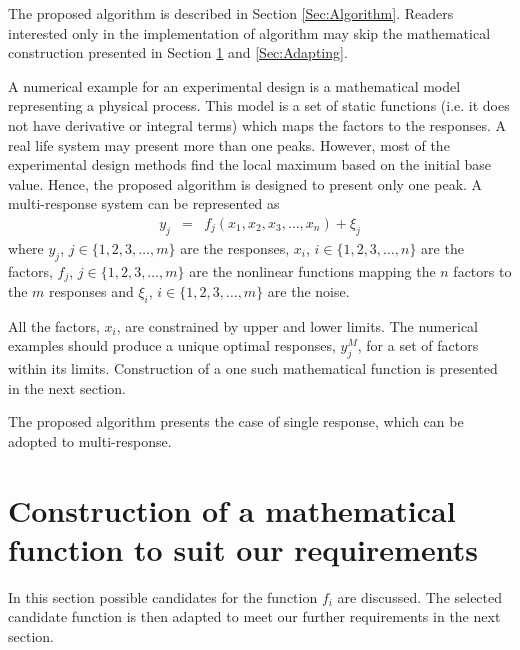 \documentclass[twocolumn]{svjour3}          %
\begin{document}
\par
The proposed algorithm is described in Section \ref{Sec:Algorithm}. Readers interested only in the implementation of algorithm may skip the mathematical construction presented in Section \ref{Sec:Construction} and \ref{Sec:Adapting}.
\par
A numerical example for an experimental design is a mathematical model representing a physical process. This model is a set of static functions (i.e. it does not have derivative or integral terms) which maps the factors to the responses. A real life system may present more than one peaks. However, most of the experimental design methods find the local maximum based on the initial base value. Hence, the proposed algorithm is designed to present only one peak. A multi-response system can be represented as %
\begin{eqnarray}
y_j &=& f_j(x_1, x_2, x_3, \dots, x_n) + \xi_j \label{Eqn:Function}
\end{eqnarray}
\noindent where $y_j$, $j\in \{1,2,3, \dots, m\}$ are the responses, $x_i$, $i\in \{1,2,3, \dots, n\}$ are the factors, $f_j$, $j\in \{1,2,3, \dots, m\}$ are the nonlinear functions mapping the $n$ factors to the $m$ responses and $\xi_i$, $i\in \{1,2,3, \dots, m\}$ are the noise.
\par
All the factors, $x_i$, are constrained by upper and lower limits. The numerical examples should produce a unique optimal responses, $y_j^M$, for a set of factors within its limits. Construction of a one such mathematical function is presented in the next section.
\par
The proposed algorithm presents the case of single response, which can be adopted to multi-response.
\section{Construction of a mathematical function to suit our requirements}
\label{Sec:Construction}
In this section possible candidates for the function $f_i$  are discussed. The selected candidate function is then adapted to meet our further requirements in the next section.
\end{document}
